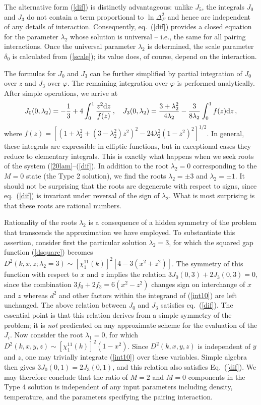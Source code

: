 The alternative form (\ref{dif}) is distinctly advantageous: unlike
$J_5$, the integrals $J_0$ and $J_3$ do not contain a term
proportional to $\ln\Delta_F^2$ and hence are independent of
any details of interaction.  Consequently, eq.~(\ref{dif}) provides
a closed equation for the parameter $\lambda_2$ whose solution
is universal -- i.e., the same for all pairing interactions.
Once the universal parameter $\lambda_2$ is determined, the scale
parameter $\delta_0$ is calculated from (\ref{scale}); its value does,
of course, depend on the interaction.

The formulas for $J_0$ and $J_3$ can be further simplified by partial
integration of $J_0$ over $z$ and $J_3$ over $\varphi$.  The remaining
integration over $\varphi$ is performed analytically.  After simple
operations, we arrive at
\begin{equation}
J_0(0,\lambda_2)=-{1\over 3}+ 4\int_0^1{z^2{\rm d}z \over f(z)} \, ,
\quad
J_3(0,\lambda_2)={3+\lambda_2^2\over 4\lambda_2}-
{3\over 8\lambda_2}\int_0^1 f(z){\rm d}z\, ,
\end{equation}
where
$f(z)=\left[(1+\lambda^2_2+(3-\lambda^2_2)z^2)^2
-24\lambda_2^2(1-z^2)^2\right]^{1/2}$.
In general, these integrals are expressible in elliptic functions, but
in exceptional cases they reduce to elementary integrals.
This is exactly what happens when we seek roots of the
system (\ref{20lam}--(\ref{dif}).  In addition to
the root $\lambda_2=0$ corresponding to the $M=0$ state (the
Type 2 solution), we find the roots $\lambda_2=\pm 3$ and
$\lambda_2=\pm 1$.  It should not be surprising that the
roots are degenerate with respect to signs, since eq.~(\ref{dif})
is invariant under reversal of the sign of $\lambda_2$.
What is most surprising is that these roots are rational numbers.

Rationality of the roots $\lambda_2$ is a consequence of a hidden
symmetry of the problem that transcends the approximation we have
employed.  To substantiate this assertion, consider first the particular
solution $\lambda_2=3$, for which the squared gap function
(\ref{dsquare}) becomes
$D^2(k,x,z;\lambda_2=3)\sim [\chi_1^{11}(k)]^2[4-3(x^2+z^2)]$.
The symmetry of this function with respect to $x$ and $z$ implies
the relation $3J_0(0,3)+2J_3(0,3)=0$, since the combination
$3f_0+2f_3=6(x^2-z^2)$ changes sign on interchange
of $x$ and $z$ whereas $d^2$ and other factors within the integrand of
(\ref{int10}) are left unchanged. The above relation between $J_0$ and $J_3$
satisfies eq.~(\ref{dif}).  The essential point is that this relation
derives from a simple symmetry of the problem; it is {\it not} 
predicated on any approximate scheme for the evaluation of the $J_i$.
Now consider the root $\lambda_1=0$, for which
$D^2(k,x,y,z)\sim [\chi_1^{11}(k)]^2(1-x^2)$. Since 
$D^2(k,x,y,z)$ is independent of $y$ and $z$, one may trivially 
integrate (\ref{int10}) over these variables.  Simple algebra then 
gives $3J_0(0,1)=2J_3(0,1)$, and this relation also satisfies 
Eq.~(\ref{dif}).  We may therefore conclude that the ratio of 
$M=2$ and $M=0$ components in the Type 4 solution is independent 
of any input parameters including density, temperature, and the 
parameters specifying the pairing interaction.

